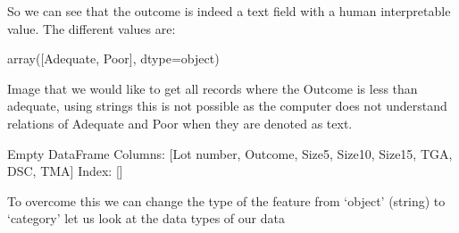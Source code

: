 \documentclass[letterpaper,10pt,english]{jupyterBook}
\begin{document}
\sphinxAtStartPar
So we can see that the outcome is indeed a text field with a human interpretable value.
The different values are:

\begin{sphinxVerbatim}[commandchars=\\\{\}]
\end{sphinxVerbatim}

\begin{sphinxVerbatim}[commandchars=\\\{\}]
array([\PYGZsq{}Adequate\PYGZsq{}, \PYGZsq{}Poor\PYGZsq{}], dtype=object)
\end{sphinxVerbatim}

\sphinxAtStartPar
Image that we would like to get all records where the Outcome is less than adequate, using strings this is not possible as the computer does not understand relations of Adequate and Poor when they are denoted as text.

\begin{sphinxVerbatim}[commandchars=\\\{\}]
\PYG{p}{[}\PYG{p}{]}
\end{sphinxVerbatim}

\begin{sphinxVerbatim}[commandchars=\\\{\}]
Empty DataFrame
Columns: [Lot number, Outcome, Size5, Size10, Size15, TGA, DSC, TMA]
Index: []
\end{sphinxVerbatim}

\sphinxAtStartPar
To overcome this we can change the type of the feature from ‘object’ (string) to ‘category’ let us look at the data types of our data

\begin{sphinxVerbatim}[commandchars=\\\{\}]
\end{sphinxVerbatim}
\end{document}
